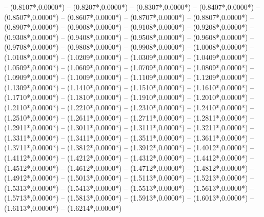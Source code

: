 {	-- ({0.8107*\dx},{0.0000*\dy})
	-- ({0.8207*\dx},{0.0000*\dy})
	-- ({0.8307*\dx},{0.0000*\dy})
	-- ({0.8407*\dx},{0.0000*\dy})
	-- ({0.8507*\dx},{0.0000*\dy})
	-- ({0.8607*\dx},{0.0000*\dy})
	-- ({0.8707*\dx},{0.0000*\dy})
	-- ({0.8807*\dx},{0.0000*\dy})
	-- ({0.8907*\dx},{0.0000*\dy})
	-- ({0.9008*\dx},{0.0000*\dy})
	-- ({0.9108*\dx},{0.0000*\dy})
	-- ({0.9208*\dx},{0.0000*\dy})
	-- ({0.9308*\dx},{0.0000*\dy})
	-- ({0.9408*\dx},{0.0000*\dy})
	-- ({0.9508*\dx},{0.0000*\dy})
	-- ({0.9608*\dx},{0.0000*\dy})
	-- ({0.9708*\dx},{0.0000*\dy})
	-- ({0.9808*\dx},{0.0000*\dy})
	-- ({0.9908*\dx},{0.0000*\dy})
	-- ({1.0008*\dx},{0.0000*\dy})
	-- ({1.0108*\dx},{0.0000*\dy})
	-- ({1.0209*\dx},{0.0000*\dy})
	-- ({1.0309*\dx},{0.0000*\dy})
	-- ({1.0409*\dx},{0.0000*\dy})
	-- ({1.0509*\dx},{0.0000*\dy})
	-- ({1.0609*\dx},{0.0000*\dy})
	-- ({1.0709*\dx},{0.0000*\dy})
	-- ({1.0809*\dx},{0.0000*\dy})
	-- ({1.0909*\dx},{0.0000*\dy})
	-- ({1.1009*\dx},{0.0000*\dy})
	-- ({1.1109*\dx},{0.0000*\dy})
	-- ({1.1209*\dx},{0.0000*\dy})
	-- ({1.1309*\dx},{0.0000*\dy})
	-- ({1.1410*\dx},{0.0000*\dy})
	-- ({1.1510*\dx},{0.0000*\dy})
	-- ({1.1610*\dx},{0.0000*\dy})
	-- ({1.1710*\dx},{0.0000*\dy})
	-- ({1.1810*\dx},{0.0000*\dy})
	-- ({1.1910*\dx},{0.0000*\dy})
	-- ({1.2010*\dx},{0.0000*\dy})
	-- ({1.2110*\dx},{0.0000*\dy})
	-- ({1.2210*\dx},{0.0000*\dy})
	-- ({1.2310*\dx},{0.0000*\dy})
	-- ({1.2410*\dx},{0.0000*\dy})
	-- ({1.2510*\dx},{0.0000*\dy})
	-- ({1.2611*\dx},{0.0000*\dy})
	-- ({1.2711*\dx},{0.0000*\dy})
	-- ({1.2811*\dx},{0.0000*\dy})
	-- ({1.2911*\dx},{0.0000*\dy})
	-- ({1.3011*\dx},{0.0000*\dy})
	-- ({1.3111*\dx},{0.0000*\dy})
	-- ({1.3211*\dx},{0.0000*\dy})
	-- ({1.3311*\dx},{0.0000*\dy})
	-- ({1.3411*\dx},{0.0000*\dy})
	-- ({1.3511*\dx},{0.0000*\dy})
	-- ({1.3611*\dx},{0.0000*\dy})
	-- ({1.3711*\dx},{0.0000*\dy})
	-- ({1.3812*\dx},{0.0000*\dy})
	-- ({1.3912*\dx},{0.0000*\dy})
	-- ({1.4012*\dx},{0.0000*\dy})
	-- ({1.4112*\dx},{0.0000*\dy})
	-- ({1.4212*\dx},{0.0000*\dy})
	-- ({1.4312*\dx},{0.0000*\dy})
	-- ({1.4412*\dx},{0.0000*\dy})
	-- ({1.4512*\dx},{0.0000*\dy})
	-- ({1.4612*\dx},{0.0000*\dy})
	-- ({1.4712*\dx},{0.0000*\dy})
	-- ({1.4812*\dx},{0.0000*\dy})
	-- ({1.4912*\dx},{0.0000*\dy})
	-- ({1.5013*\dx},{0.0000*\dy})
	-- ({1.5113*\dx},{0.0000*\dy})
	-- ({1.5213*\dx},{0.0000*\dy})
	-- ({1.5313*\dx},{0.0000*\dy})
	-- ({1.5413*\dx},{0.0000*\dy})
	-- ({1.5513*\dx},{0.0000*\dy})
	-- ({1.5613*\dx},{0.0000*\dy})
	-- ({1.5713*\dx},{0.0000*\dy})
	-- ({1.5813*\dx},{0.0000*\dy})
	-- ({1.5913*\dx},{0.0000*\dy})
	-- ({1.6013*\dx},{0.0000*\dy})
	-- ({1.6113*\dx},{0.0000*\dy})
	-- ({1.6214*\dx},{0.0000*\dy})
}
